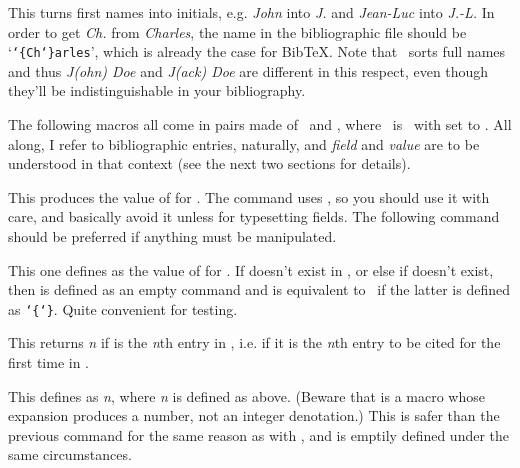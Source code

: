 \cmddef{\AbbreviateFirstname}
This turns first names into initials, e.g. \textit{John} into \textit{J.} and
\textit{Jean-Luc} into \textit{J.-L.} In order to get \textit{Ch.} from
\textit{Charles}, the name in the bibliographic file should be
`\texttt{\char`\{Ch\char`\}arles}', which is already the case for Bib\TeX.
Note that \lib\ sorts full names  and thus \textit{J(ohn) Doe} and \textit{J(ack) Doe}
are different in this respect, even though they'll be indistinguishable in your
bibliography.






\onelineskip
The following macros all come in pairs made of \tcmd\Command\ and \tcmd\CommandFor,
where \tcmd\Command\ is \tcmd\CommandFor\ with  set to \tcmd\EntryKey.
All along, I refer to bibliographic entries, naturally, and \textit{field\/} and \textit{value\/}
are to be understood in that context (see the next two sections for details).

This produces the value of  for . The command
uses \tcmd\lowercase, so you should use it with care, and basically avoid it
unless for typesetting fields. The following command should be preferred
if anything must be manipulated.

This one defines  as the value of  for .
If  doesn't exist in , or else if 
doesn't exist, then  is defined as an empty command and
is equivalent to \tcmd\empty\ if the latter is defined as
\tcmd\def\tcmd\empty\texttt{\char`\{\char`\}}. Quite convenient for testing.

This returns \textit{n} if  is the \textit{n}th entry
in , i.e. if it is the \textit{n}th entry to be cited for the
first time in .

This defines  as \textit{n}, where \textit{n} is defined
as above. (Beware that  is a macro whose expansion produces
a number, not an integer denotation.) This is safer than the previous command
for the same reason as with \tcmd\RetrieveFieldFor, and is emptily defined
under the same circumstances.

